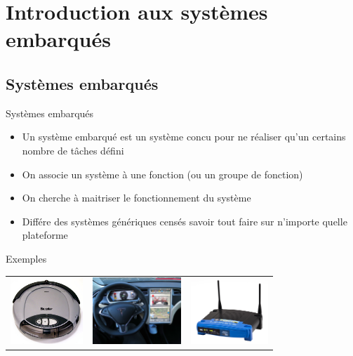 \section{Introduction aux systèmes embarqués}

\subsection{Systèmes embarqués}
\begin{frame}{Systèmes embarqués}
  \begin{itemize}
  \item Un système embarqué est un système concu pour ne réaliser qu'un certains nombre de tâches défini
  \item On associe un système à une fonction (ou un groupe de fonction)
  \item On cherche à maitriser le fonctionnement du système
  \item Différe des systèmes génériques censés savoir tout faire sur n'importe quelle plateforme
  \end{itemize}
\end{frame}

\begin{frame}{Exemples}
  \begin{tabular}{ccc}
    \includegraphics[height=2.5cm]{pictures/roomba.jpg} & \hspace{1.5cm}
    \includegraphics[height=2.5cm]{pictures/tesla.jpg} & \hspace{1.5cm}
    \includegraphics[height=2.5cm]{pictures/router.jpg}
  \end{tabular}
\end{frame}

